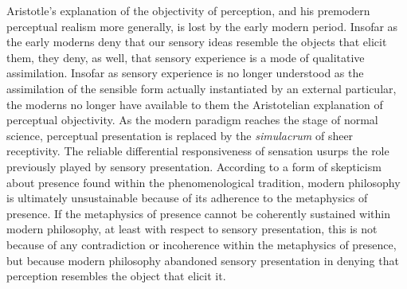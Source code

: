 Aristotle's explanation of the objectivity of perception, and his premodern perceptual realism more generally, is lost by the early modern period. Insofar as the early moderns deny that our sensory ideas resemble the objects that elicit them, they deny, as well, that sensory experience is a mode of qualitative assimilation. Insofar as sensory experience is no longer understood as the assimilation of the sensible form actually instantiated by an external particular, the moderns no longer have available to them the Aristotelian explanation of perceptual objectivity. As the modern paradigm reaches the stage of normal science, perceptual presentation is replaced by the \emph{simulacrum} of sheer receptivity. The reliable differential responsiveness of sensation usurps the role previously played by sensory presentation. According to a form of skepticism about presence found within the phenomenological tradition, modern philosophy is ultimately unsustainable because of its adherence to the metaphysics of presence. If the metaphysics of presence cannot be coherently sustained within modern philosophy, at least with respect to sensory presentation, this is not because of any contradiction or incoherence within the metaphysics of presence, but because modern philosophy abandoned sensory presentation in denying that perception resembles the object that elicit it. 


